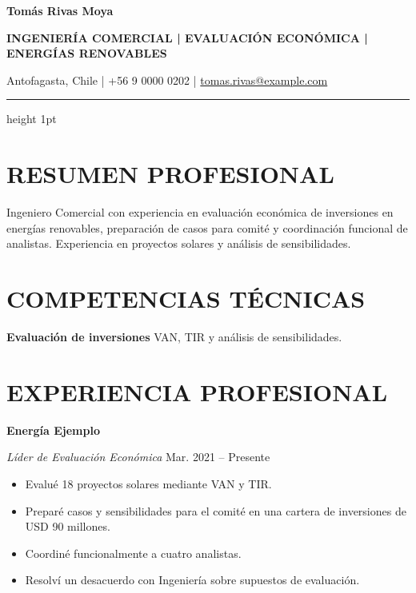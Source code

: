 \documentclass[10pt,a4paper]{article}
\newcommand{\entidad}[2]{%
    \noindent
    \textbf{#1}\hfill
    {\small\color{secundario}#2}\par
}
\newcommand{\cargo}[2]{%
    \noindent
    \textit{#1}\hfill
    {\small\color{secundario}#2}\par
}
\newcommand{\detalle}[2]{%
    \noindent
    \textbf{#1} #2\par
    \vspace{2pt}
}
\begin{document}
\fontsize{9.2}{11}\selectfont
\color{texto}

\begin{center}
    {\fontsize{23}{27}\selectfont
     \bfseries\color{principal}Tomás Rivas Moya\par}

    \vspace{4pt}

    {\fontsize{9.5}{12}\selectfont
     \bfseries
     INGENIERÍA COMERCIAL | EVALUACIÓN ECONÓMICA | ENERGÍAS RENOVABLES
     \par}

    \vspace{5pt}

    {\fontsize{8.5}{10.5}\selectfont\color{secundario}
     Antofagasta, Chile \quad | \quad +56 9 0000 0202 \quad | \quad
     \href{mailto:tomas.rivas@example.com}{tomas.rivas@example.com}
     \par}
\end{center}

\vspace{-3pt}
{\color{principal}\hrule height 1pt}
\vspace{2pt}

\section{RESUMEN PROFESIONAL}

Ingeniero Comercial con experiencia en evaluación económica de inversiones en
energías renovables, preparación de casos para comité y coordinación funcional
de analistas. Experiencia en proyectos solares y análisis de sensibilidades.

\section{COMPETENCIAS TÉCNICAS}

\detalle{Evaluación de inversiones}{VAN, TIR y análisis de sensibilidades.}

\section{EXPERIENCIA PROFESIONAL}

\entidad{Energía Ejemplo}{}
\cargo{Líder de Evaluación Económica}{Mar. 2021 -- Presente}

\begin{itemize}
    \item Evalué 18 proyectos solares mediante VAN y TIR.
    \item Preparé casos y sensibilidades para el comité en una cartera de inversiones de USD 90 millones.
    \item Coordiné funcionalmente a cuatro analistas.
    \item Resolví un desacuerdo con Ingeniería sobre supuestos de evaluación.
\end{itemize}
\end{document}
